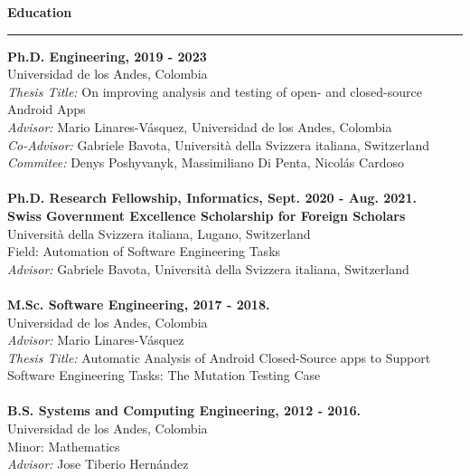 \documentclass[letterpaper,11pt,oneside]{article}
\begin{document}
\noindent \Large{\textbf{Education}} \\
\vspace{-2ex}
\hrule 
\normalsize
\vspace{2ex}
\noindent \textbf{Ph.D. Engineering, 2019 - 2023} \\
	Universidad de los Andes, Colombia \\
	{\small \textit{Thesis Title:} On improving analysis and testing of open- and closed-source Android Apps \\}
	\textit{Advisor:} Mario Linares-V\'{a}squez, Universidad de los Andes, Colombia \\
	\textit{Co-Advisor:} Gabriele Bavota, Università della Svizzera italiana, Switzerland \\
	\textit{Commitee:} Denys Poshyvanyk, Massimiliano Di Penta, Nicol\'as Cardoso\\
	\\
\textbf{Ph.D. Research Fellowship, Informatics, Sept. 2020 - Aug. 2021.} \\
	\textbf{Swiss Government Excellence Scholarship for Foreign Scholars} \\
	Università della Svizzera italiana, Lugano, Switzerland \\
	Field: Automation of Software Engineering Tasks \\
	\textit{Advisor:} Gabriele Bavota, Università della Svizzera italiana, Switzerland \\
	\\
\textbf{M.Sc. Software Engineering, 2017 - 2018.} \\
	Universidad de los Andes, Colombia  \\
	\textit{Advisor:} Mario Linares-V\'{a}squez \\
	{\footnotesize \textit{Thesis Title:} Automatic Analysis of Android Closed-Source apps to Support Software Engineering Tasks: The Mutation Testing Case \\}
	\\
\textbf{B.S. Systems and Computing Engineering, 2012 - 2016.} \\
	Universidad de los Andes, Colombia  \\
	Minor: Mathematics \\
	\textit{Advisor:} Jose Tiberio Hern\'{a}ndez \\
	
\end{document}
